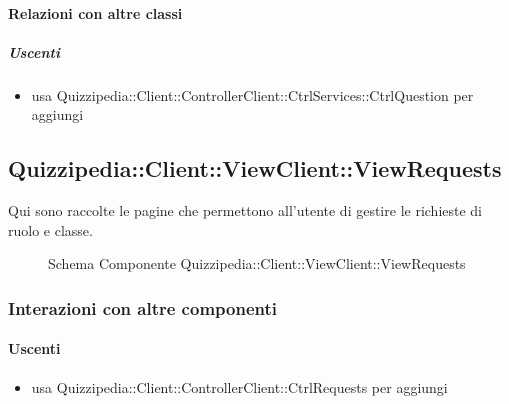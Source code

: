 \paragraph{Relazioni con altre classi}
\subparagraph{Uscenti}
\begin{itemize}
\item usa Quizzipedia::Client::ControllerClient::CtrlServices::CtrlQuestion per aggiungi
\end{itemize}
\subsection{Quizzipedia::Client::ViewClient::ViewRequests}
Qui sono raccolte le pagine che permettono all'utente di gestire le richieste di ruolo e classe.
\begin{figure}[H]
\centering
\noindent{}
\caption[Schema Componente Quizzipedia::Client::ViewClient::ViewRequests]{Schema Componente Quizzipedia::Client::ViewClient::ViewRequests}
\end{figure}
\subsubsection{Interazioni con altre componenti}
\paragraph{Uscenti}
\begin{itemize}
\item usa Quizzipedia::Client::ControllerClient::CtrlRequests per aggiungi
\end{itemize}
